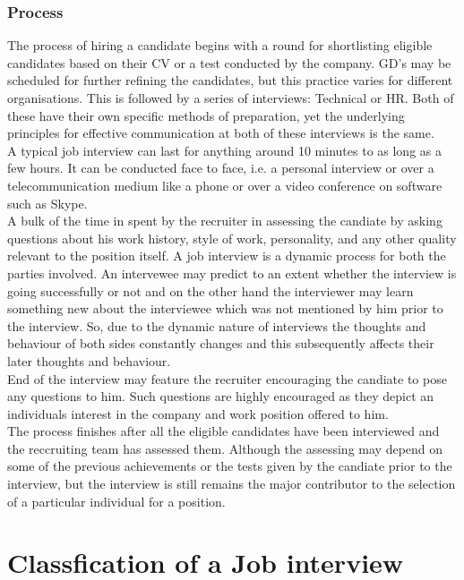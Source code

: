 \documentclass[a4paper,12pt]{report}
\begin{document}
\subsection{Process}                   %
The process of hiring a candidate begins with a round for shortlisting eligible candidates based on their CV or
a test conducted by the company. GD's may be scheduled for further refining the candidates, but this practice
varies for different organisations. This is followed by a series of interviews: Technical or HR. Both of these have their own specific
methods of preparation, yet the underlying principles for effective communication at both of these interviews is the same.\\
A typical job interview can last for anything around 10 minutes to as long as a few hours. It can be conducted face to face,
 i.e. a personal interview or over a telecommunication medium like a phone or over a video conference on software such as Skype.\\
A bulk of the time in spent by the recruiter in assessing the candiate by asking questions about his work history, style of work, personality,
and any other quality relevant to the position itself. A job interview is a dynamic process for both the parties involved.
An intervewee may predict to an extent whether the interview is going successfully or not and on the other hand the interviewer
may learn something new about the interviewee which was not mentioned by him prior to the interview. So,
due to the dynamic nature of interviews the thoughts and behaviour of both sides constantly changes and
this subsequently affects their later thoughts and behaviour.\\End of the interview may feature the recruiter encouraging the candiate to pose
any questions to him. Such questions are highly encouraged as they depict an individuals interest in the company and work position offered to him.\\
The process finishes after all the eligible candidates have been interviewed and the reccruiting team has assessed them.
Although the assessing may depend on some of the previous achievements or the tests given by the candiate prior to the interview, but the interview
is still remains the major contributor to the selection of a particular individual for a position.


\chapter{Classfication of a Job interview}           %
\end{document}
